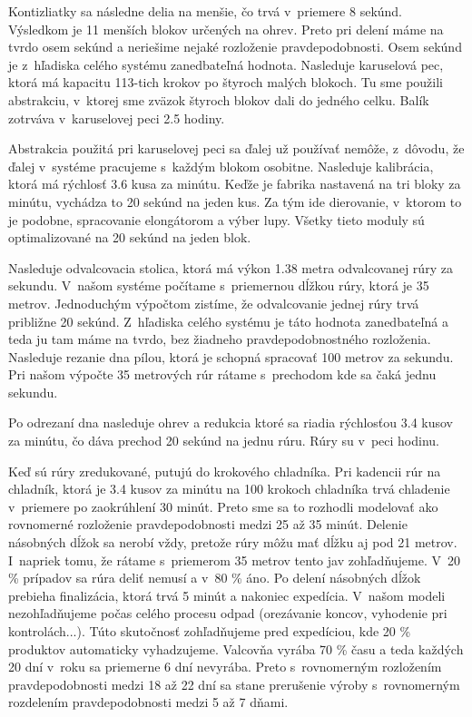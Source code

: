 \documentclass[]{article}
\begin{document}
Kontizliatky sa následne delia na menšie, čo trvá v~priemere 8 sekúnd. Výsledkom je 11 menších blokov určených na ohrev. Preto pri delení máme na tvrdo osem sekúnd a neriešime nejaké rozloženie pravdepodobnosti. Osem sekúnd je z~hľadiska celého systému zanedbateľná hodnota.
Nasleduje karuselová pec, ktorá má kapacitu 113-tich krokov po štyroch malých blokoch. Tu sme použili abstrakciu, v~ktorej sme zväzok štyroch blokov dali do jedného celku. Balík zotrváva v~karuselovej peci 2.5 hodiny.

Abstrakcia použitá pri karuselovej peci sa ďalej už používať nemôže, z~dôvodu, že ďalej v~systéme pracujeme s~každým blokom osobitne. Nasleduje kalibrácia, ktorá má rýchlosť 3.6 kusa za minútu. Keďže je fabrika nastavená na tri bloky za minútu, vychádza to 20 sekúnd na jeden kus. Za tým ide dierovanie, v~ktorom to je podobne, spracovanie elongátorom a výber lupy. Všetky tieto moduly sú optimalizované na 20 sekúnd na jeden blok.

Nasleduje odvalcovacia stolica, ktorá má výkon 1.38 metra odvalcovanej rúry za sekundu. V~našom systéme počítame s~priemernou dĺžkou rúry, ktorá je 35 metrov. Jednoduchým výpočtom zistíme, že odvalcovanie jednej rúry trvá približne 20 sekúnd. Z~hľadiska celého systému je táto hodnota zanedbateľná a teda ju tam máme na tvrdo, bez žiadneho pravdepodobnostného rozloženia.
Nasleduje rezanie dna pílou, ktorá je schopná spracovať 100 metrov za sekundu. Pri našom výpočte 35 metrových rúr rátame s~prechodom kde sa čaká jednu sekundu.

Po odrezaní dna nasleduje ohrev a redukcia ktoré sa riadia rýchlosťou 3.4 kusov za minútu, čo dáva prechod 20 sekúnd na jednu rúru. Rúry su v~peci hodinu.

Keď sú rúry zredukované, putujú do krokového chladníka. Pri kadencii rúr na chladník, ktorá je 3.4 kusov za minútu na 100 krokoch chladníka trvá chladenie v~priemere  po zaokrúhlení 30 minút. Preto sme sa to rozhodli modelovať ako rovnomerné rozloženie pravdepodobnosti medzi 25 až 35 minút.
Delenie násobných dĺžok sa nerobí vždy, pretože rúry môžu mať dĺžku aj pod 21 metrov. I~napriek tomu, že rátame s~priemerom 35 metrov tento jav zohľadňujeme. V~20 \% prípadov sa rúra deliť nemusí a v~80 \% áno.
Po delení násobných dĺžok prebieha finalizácia, ktorá trvá 5 minút a nakoniec expedícia. V~našom modeli nezohľadňujeme počas celého procesu odpad (orezávanie koncov, vyhodenie pri kontrolách...). Túto skutočnosť zohľadňujeme pred expedíciou, kde 20 \% produktov automaticky vyhadzujeme.
Valcovňa vyrába 70 \% času a teda každých 20 dní v~roku sa priemerne 6 dní nevyrába. Preto s~rovnomerným rozložením pravdepodobnosti medzi 18 až 22 dní sa stane prerušenie výroby s~rovnomerným rozdelením pravdepodobnosti medzi 5 až 7 dňami.
\end{document}
